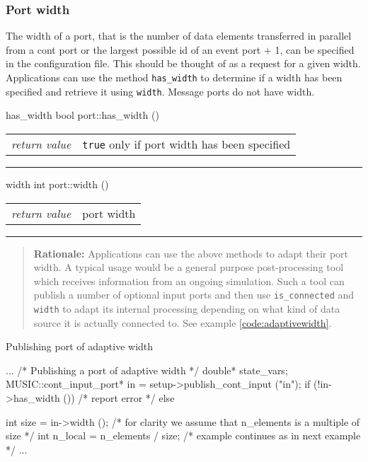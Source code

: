\documentclass[a4paper,twoside]{report}
\makeatletter
\newenvironment{rationale}%
{\par\begin{quote}\textbf{Rationale:}}%
{\par\end{quote}}
\newenvironment{parameters}%
{\begin{tabular}{@{\hspace{2em}}lp{0.6\textwidth}}}%
{\end{tabular}\par\vspace{1mm}\par\hrule\par\vspace{5mm}}
\makeatother
\begin{document}
\subsubsection{Port width}
\label{sec:width}

The width of a port, that is the number of data
elements transferred in parallel from a cont port or the largest
possible id of an event port $+$ 1, can be specified in the
configuration file.  This should be thought of as a request for a
given width.  Applications can use the method \lstinline|has_width| to
determine if a width has been specified and retrieve it using
\lstinline|width|.  Message ports do not have width.

\begin{head}{has_width}
  bool port::has_width ()
\end{head}
\begin{parameters}
  \emph{return value} & \lstinline|true| only if port width has been
                         specified \\
\end{parameters}

\begin{head}{width}
  int port::width ()
\end{head}
\begin{parameters}
  \emph{return value} & port width \\
\end{parameters}

\begin{rationale}
  Applications can use the above methods to adapt their port width.  A
  typical usage would be a general purpose post-processing tool which
  receives information from an ongoing simulation.  Such a tool can
  publish a number of optional input ports and then use
  \lstinline|is_connected| and \lstinline|width| to adapt its internal
  processing depending on what kind of data source it is actually
  connected to.  See example \ref{code:adaptivewidth}.
\end{rationale}


\begin{code}{Publishing port of adaptive width\label{code:adaptivewidth}}
{
  ...
  /* Publishing a port of adaptive width */
  double* state_vars;
  MUSIC::cont_input_port* in =
     setup->publish_cont_input ("in");
  if (!in->has_width ())
    /* report error */
  else
    {
      int size = in->width ();
      /* for clarity we assume that n_elements
         is a multiple of size */
      int n_local = n_elements / size;
      /* example continues as in next example */
      ...
      
    }
}
\end{code}
\end{document}
